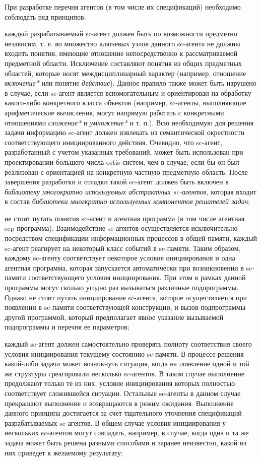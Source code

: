 При разработке перечня агентов (в том числе их спецификаций) необходимо соблюдать ряд принципов:

\begin{textitemize}
\item каждый разрабатываемый sc-агент должен быть по возможности предметно независим, т. е. во множество ключевых узлов данного sc-агента не должны входить понятия, имеющие отношение непосредственно к рассматриваемой предметной области. Исключение составляют понятия из общих предметных областей, которые носят междисциплинарный характер (например, отношение \textit{включение*} или понятие \textit{действие}). Данное правило также может быть нарушено в случае, если sc-агент является вспомогательным и ориентирован на обработку какого-либо конкретного класса объектов (например, sc-агенты, выполняющие арифметические вычисления, могут напрямую работать с конкретными отношениями \textit{сложение*} и \textit{умножение*} и т. п.). Всю необходимую для решения задачи информацию sc-агент должен извлекать из семантической окрестности соответствующего инициированного действия. Очевидно, что sc-агент, разработанный с учетом указанных требований, может быть использован при проектировании большего числа ostis-систем, чем в случае, если бы он был реализован с ориентацией на конкретную частную предметную область. После завершения разработки и отладки такой sc-агент должен быть включен в \textit{библиотеку многократно используемых абстрактных sc-агентов}, которая входит в состав \textit{библиотеки многкратно используемых компонентов решателей задач};
\item не стоит путать понятия sc-агент и агентная программа (в том числе агентная scp-программа). Взаимодействие sc-агентов осуществляется исключительно посредством спецификации информационных процессов в общей памяти, каждый sc-агент реагирует на некоторый класс событий в sc-памяти. Таким образом, каждому sc-агенту соответствует некоторое условие инициирования и одна агентная программа, которая запускается автоматически при возникновении в sc-памяти соответствующего условия инициирования. При этом в рамках данной программы могут сколько угодно раз вызываться различные подпрограммы. Однако не стоит путать инициирование sc-агента, которое осуществляется при появлении в sc-памяти соответствующей конструкции, и вызов подпрограммы другой программой, который предполагает явное указание вызываемой подпрограммы и перечня ее параметров;
\item каждый sc-агент должен самостоятельно проверять полноту соответствия своего условия инициирования текущему состоянию sc-памяти. В процессе решения какой-либо задачи может возникнуть ситуация, когда на появление одной и той же структуры среагировали несколько sc-агентов. В таком случае выполнение продолжают только те из них, условие инициирования которых полностью соответствует сложившейся ситуации. Остальные sc-агенты в данном случае прекращают выполнение и возвращаются в режим ожидания. Выполнение данного принципа достигается за счет тщательного уточнения спецификаций разрабатываемых sc-агентов. В общем случае условия инициирования у нескольких sc-агентов могут совпадать, например, в случае, когда одна и та же задача может быть решена разными способами и заранее неизвестно, какой из них приведет к желаемому результату;

\end{textitemize}
